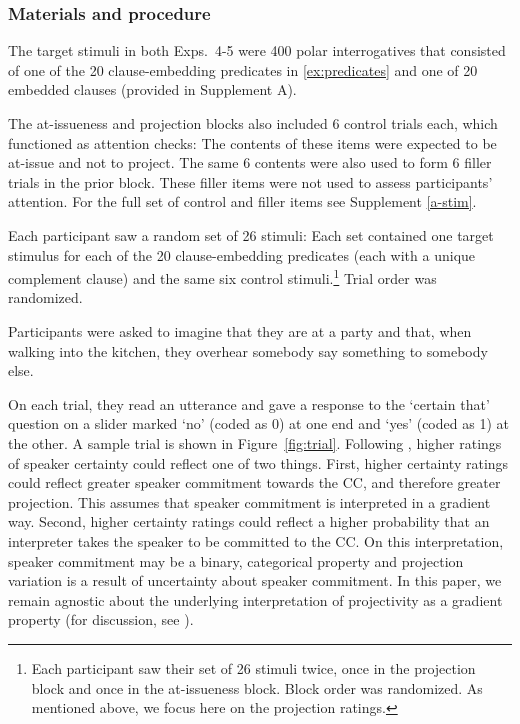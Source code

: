 \documentclass[times,linguex,xcolor]{glossa}
\begin{document}
    \subsubsection{Materials and procedure}
    
    The target stimuli in both Exps.~4-5 were 400 polar interrogatives that consisted of one of the 20 clause-embedding predicates in \ref{ex:predicates} and one of 20 embedded clauses (provided in Supplement A). 
    
    
    The at-issueness and projection blocks also included 6 control trials each, which functioned as attention checks: The contents of these items were expected to be at-issue and not to project. The same 6 contents were also used to form 6 filler trials in the prior block. These filler items were not used to assess participants' attention. For the full set of control and filler items see Supplement \ref{a-stim}.

              Each participant saw a random set of 26 stimuli: Each set contained one target stimulus for each of the 20 clause-embedding predicates (each with a unique complement clause) and the same six control stimuli.\footnote{Each participant saw their set of 26 stimuli twice, once in the projection block and once in the at-issueness block. Block order was randomized. As mentioned above, we focus here on the projection ratings.} Trial order was randomized.
  	
              Participants were asked to imagine that they are at a party and that, when walking into the kitchen, they overhear somebody say something to somebody else.
              
              On each trial, they read an utterance and gave a response to the `certain that' question on a slider marked `no' (coded as 0) at one end and `yes' (coded as 1) at the other. A sample trial %
              is shown in Figure~\ref{fig:trial}.            
              Following \citealt{tonhauser_how_2018}, higher ratings of speaker certainty could reflect one of two things. First, higher certainty ratings could reflect greater speaker commitment towards the CC, and therefore greater projection. This assumes that speaker commitment is interpreted in a gradient way. Second, higher certainty ratings could reflect a higher probability that an interpreter takes the speaker to be committed to the CC.  On this interpretation, speaker commitment may be a binary, categorical property and projection variation is a result of uncertainty about speaker commitment. In this paper, we remain agnostic about the underlying interpretation of projectivity as a gradient property (for discussion, see  \citealt{grove_factivity_2023}).
              
\end{document}
